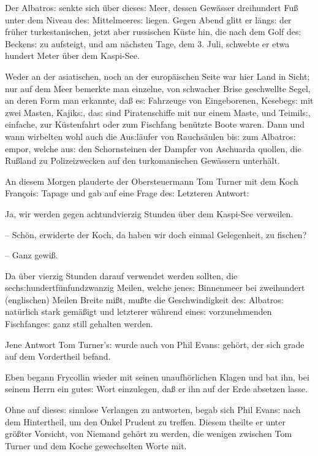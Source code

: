 \documentclass[oneside,12pt]{book}
\newcommand{\s}{s:}
\begin{document}
Der {\glqq}Albatro{\s}{\grqq} senkte sich \"uber diese{\s} Meer,
dessen Gew\"asser dreihundert Fu{\ss} unter dem Niveau de{\s}
Mittelmeere{\s} liegen. Gegen Abend glitt er l\"ang{\s} der fr\"uher
turkestanischen, jetzt aber russischen K\"uste hin, die nach dem Golf
de{\s} Becken{\s} zu aufsteigt, und am n\"achsten Tage, dem 3. Juli,
schwebte er etwa hundert Meter \"uber dem Kaspi-See.

Weder an der asiatischen, noch an der europ\"aischen Seite war hier
Land in Sicht; nur auf dem Meer bemerkte man einzelne, von schwacher
Brise geschwellte Segel, an deren Form man erkannte, da{\ss} e{\s}
Fahrzeuge von Eingeborenen, Kesebeg{\s} mit zwei Masten, Kajik{\s},
da{\s} sind Piratenschiffe mit nur einem Maste, und Teimil{\s},
einfache, zur K\"ustenfahrt oder zum Fischfang ben\"utzte Boote
waren. Dann und wann wirbelten wohl auch die Au{\s}l\"aufer von
Rauchs\"aulen bi{\s} zum {\glqq}Albatro{\s}{\grqq} empor, welche
au{\s} den Schornsteinen der Dampfer von Aschuarda quollen, die
Ru{\ss}land zu Polizeizwecken auf den turkomanischen Gew\"assern
unterh\"alt.

An diesem Morgen plauderte der Obersteuermann Tom Turner mit dem Koch
Fran\c{c}oi{\s} Tapage und gab auf eine Frage de{\s} Letzteren
Antwort:

{\glqq}Ja, wir werden gegen achtundvierzig Stunden \"uber dem
Kaspi-See verweilen.

-- Sch\"on, erwiderte der Koch, da haben wir doch einmal Gelegenheit,
zu fischen?

-- Ganz gewi{\ss}.{\grqq}

Da \"uber vierzig Stunden darauf verwendet werden sollten, die
sech{\s}hundertf\"unfundzwanzig Meilen, welche jene{\s} Binnenmeer
bei zweihundert (englischen) Meilen Breite mi{\ss}t, mu{\ss}te die
Geschwindigkeit de{\s} {\glqq}Albatro{\s}{\grqq} nat\"urlich stark
gem\"a{\ss}igt und letzterer w\"ahrend eine{\s} vorzunehmenden
Fischfange{\s} ganz still gehalten werden.

Jene Antwort Tom Turner'{\s} wurde auch von Phil Evan{\s} geh\"ort,
der sich grade auf dem Vordertheil befand.

Eben begann Frycollin wieder mit seinen unaufh\"orlichen Klagen und
bat ihn, bei seinem Herrn ein gute{\s} Wort einzulegen, da{\ss} er
ihn {\glqq}auf der Erde absetzen{\grqq} lasse.

Ohne auf diese{\s} sinnlose Verlangen zu antworten, begab sich Phil
Evan{\s} nach dem Hintertheil, um den Onkel Prudent zu treffen.
Diesem theilte er unter gr\"o{\ss}ter Vorsicht, von Niemand geh\"ort
zu werden, die wenigen zwischen Tom Turner und dem Koche gewechselten
Worte mit.
\end{document}
